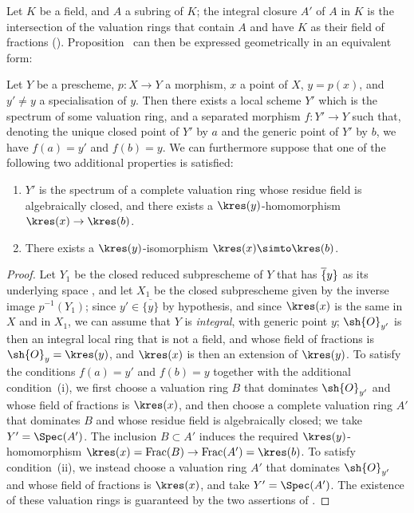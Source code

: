 \begin{env}[7.1.3]
\label{II.7.1.3}
Let $K$ be a field, and $A$ a subring of $K$;
the integral closure $A'$ of $A$ in $K$ is the intersection of the valuation rings that contain $A$ and have $K$ as their field of fractions (\cite[p.~51, th.~2]{I-11}).
Proposition~ can then be expressed geometrically in an equivalent form:
\end{env}

\begin{proposition}[7.1.4]
\label{II.7.1.4}
Let $Y$ be a prescheme, $p:X\to Y$ a morphism, $x$ a point of $X$, $y=p(x)$, and $y'\neq y$ a specialisation  of $y$.
Then there exists a local scheme $Y'$ which is the spectrum of some valuation ring, and a separated morphism $f:Y'\to Y$ such that, denoting the unique closed point of $Y'$ by $a$ and the generic point of $Y'$ by $b$, we have $f(a)=y'$ and $f(b)=y$.
We can furthermore suppose that one of the following two additional properties is satisfied:
\begin{enumerate}
    \item[\rm{(i)}] $Y'$ is the spectrum of a complete valuation ring whose residue field is algebraically closed, and there exists a $\kres(y)$-homomorphism $\kres(x)\to\kres(b)$.
    \item[\rm{(ii)}] There exists a $\kres(y)$-isomorphism $\kres(x)\simto\kres(b)$.
\end{enumerate}
\end{proposition}

\begin{proof}
Let $Y_1$ be the closed reduced subprescheme of $Y$ that has $\overline\{y\}$ as its underlying space , and let $X_1$ be the closed subprescheme given by the inverse image $p^{-1}(Y_1)$;
since $y'\in\overline{\{y\}}$ by hypothesis, and since $\kres(x)$ is the same in $X$ and in $X_1$, we can assume that $Y$ is \emph{integral}, with generic point $y$;
$\sh{O}_{y'}$ is then an integral local ring that is not a field, and whose field of fractions is $\sh{O}_y=\kres(y)$, and $\kres(x)$ is then an extension of $\kres(y)$.
To satisfy the conditions $f(a)=y'$ and $f(b)=y$ together with the additional condition~(i), we first choose a valuation ring $B$ that dominates $\sh{O}_{y'}$ and whose field of fractions is $\kres(x)$, and then choose a complete valuation ring $A'$ that dominates $B$ and whose residue field is algebraically closed; we take $Y'=\Spec(A')$.
The inclusion $B\subset A'$ induces the required $\kres(y)$-homomorphism $\kres(x)=\operatorname{Frac}(B)\to\operatorname{Frac}(A')=\kres(b)$.
To satisfy condition~(ii), we instead choose a valuation ring $A'$ that dominates $\sh{O}_{y'}$ and whose field of fractions is $\kres(x)$, and take $Y'=\Spec(A')$.
The existence of these valuation rings is guaranteed by the two assertions of .
\end{proof}

